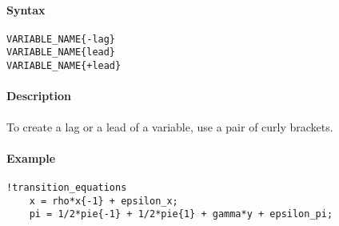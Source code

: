 


	\paragraph{Syntax}\label{syntax}

\begin{verbatim}
VARIABLE_NAME{-lag}
VARIABLE_NAME{lead}
VARIABLE_NAME{+lead}
\end{verbatim}

\paragraph{Description}\label{description}

To create a lag or a lead of a variable, use a pair of curly brackets.

\paragraph{Example}\label{example}

\begin{verbatim}
!transition_equations
    x = rho*x{-1} + epsilon_x;
    pi = 1/2*pie{-1} + 1/2*pie{1} + gamma*y + epsilon_pi;
\end{verbatim}


